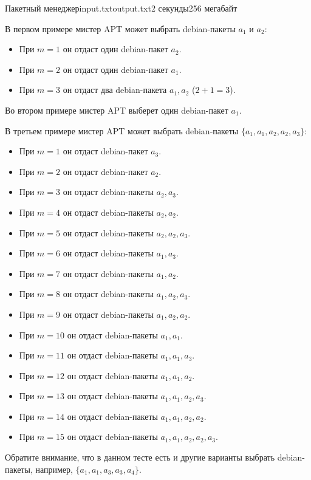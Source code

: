 \begin{problem}{Пакетный менеджер}{input.txt}{output.txt}{2 секунды}{256 мегабайт}
\Notes

В первом примере мистер APT может выбрать debian-пакеты $a_1$ и  $a_2$:
\begin{itemize}
\item При $m = 1$ он отдаст один debian-пакет $a_2$.
\item При $m = 2$ он отдаст один debian-пакет $a_1$.
\item При $m = 3$ он отдаст два debian-пакета $a_1, a_2$ ($2 + 1 = 3$).
\end{itemize}

Во втором примере мистер APT выберет один debian-пакет $a_1$.

\bigskip

В третьем примере мистер APT может выбрать debian-пакеты $\{a_1, a_1, a_2, a_2, a_3\}$:
\begin{itemize}
\item При $m = 1$ он отдаст debian-пакет $a_3$.
\item При $m = 2$ он отдаст debian-пакет $a_2$.
\item При $m = 3$ он отдаст debian-пакеты $a_2, a_3$.
\item При $m = 4$ он отдаст debian-пакеты $a_2, a_2$.
\item При $m = 5$ он отдаст debian-пакеты $a_2, a_2, a_3$.
\item При $m = 6$ он отдаст debian-пакеты $a_1, a_3$.
\item При $m = 7$ он отдаст debian-пакеты $a_1, a_2$.
\item При $m = 8$ он отдаст debian-пакеты $a_1, a_2, a_3$.
\item При $m = 9$ он отдаст debian-пакеты $a_1, a_2, a_2$.
\item При $m = 10$ он отдаст debian-пакеты $a_1, a_1$.
\item При $m = 11$ он отдаст debian-пакеты $a_1, a_1, a_3$.
\item При $m = 12$ он отдаст debian-пакеты $a_1, a_1, a_2$.
\item При $m = 13$ он отдаст debian-пакеты $a_1, a_1, a_2, a_3$.
\item При $m = 14$ он отдаст debian-пакеты $a_1, a_1, a_2, a_2$.
\item При $m = 15$ он отдаст debian-пакеты $a_1, a_1, a_2, a_2, a_3$.
\end{itemize}
Обратите внимание, что в данном тесте есть и другие варианты выбрать debian-пакеты, например, $\{a_1, a_1, a_3, a_3, a_4\}$.

\bigskip


\end{problem}

